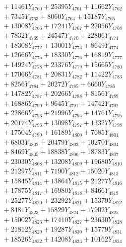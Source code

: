 \documentclass[a4paper,10pt]{article}
\begin{document}
{\begin{align}
&\;  + 11461 Y_{4760} + 25395 Y_{4761} + 11662 Y_{4762} \\[0.3ex]
&\;  + 7345 Y_{4763} + 8060 Y_{4764} + 15187 Y_{4765} \\[0.3ex]
&\;  + 13008 Y_{4766} + 17241 Y_{4767} + 22056 Y_{4768} \\[0.5ex]\allowbreak
&\;  + 7832 Y_{4769} + 24547 Y_{4770} + 22806 Y_{4771} \\[0.3ex]
&\;  + 18308 Y_{4772} + 13001 Y_{4773} + 8649 Y_{4774} \\[0.3ex]
&\;  + 12666 Y_{4775} + 18330 Y_{4776} + 16819 Y_{4777} \\[0.3ex]
&\;  + 14924 Y_{4778} + 23376 Y_{4779} + 15665 Y_{4780} \\[0.3ex]
&\;  + 17066 Y_{4781} + 20831 Y_{4782} + 11422 Y_{4783} \\[0.3ex]
&\;  + 8256 Y_{4784} + 20272 Y_{4785} + 6660 Y_{4786} \\[0.3ex]
&\;  + 14782 Y_{4787} + 20266 Y_{4788} + 8156 Y_{4789} \\[0.3ex]
&\;  + 16886 Y_{4790} + 9645 Y_{4791} + 14742 Y_{4792} \\[0.3ex]
&\;  + 22866 Y_{4793} + 21996 Y_{4794} + 14761 Y_{4795} \\[0.3ex]
&\;  + 20174 Y_{4796} + 13098 Y_{4797} + 13327 Y_{4798} \\[0.5ex]\allowbreak
&\;  + 17504 Y_{4799} + 16189 Y_{4800} + 7685 Y_{4801} \\[0.3ex]
&\;  + 6803 Y_{4802} + 20479 Y_{4803} + 10270 Y_{4804} \\[0.3ex]
&\;  + 8469 Y_{4805} + 18838 Y_{4806} + 18783 Y_{4807} \\[0.3ex]
&\;  + 23030 Y_{4808} + 13208 Y_{4809} + 19680 Y_{4810} \\[0.3ex]
&\;  + 21297 Y_{4811} + 7190 Y_{4812} + 15020 Y_{4813} \\[0.3ex]
&\;  + 15845 Y_{4814} + 13864 Y_{4815} + 21277 Y_{4816} \\[0.3ex]
&\;  + 17875 Y_{4817} + 16980 Y_{4818} + 8466 Y_{4819} \\[0.3ex]
&\;  + 25277 Y_{4820} + 23292 Y_{4821} + 15379 Y_{4822} \\[0.3ex]
&\;  + 8481 Y_{4823} + 15829 Y_{4824} + 17902 Y_{4825} \\[0.3ex]
&\;  + 15002 Y_{4826} + 17410 Y_{4827} + 23630 Y_{4828} \\[0.5ex]\allowbreak
&\;  + 21812 Y_{4829} + 19287 Y_{4830} + 15779 Y_{4831} \\[0.3ex]
&\;  + 18526 Y_{4832} + 14208 Y_{4833} + 10162 Y_{4834} \\[0.3ex]

\end{align}}
\end{document}
